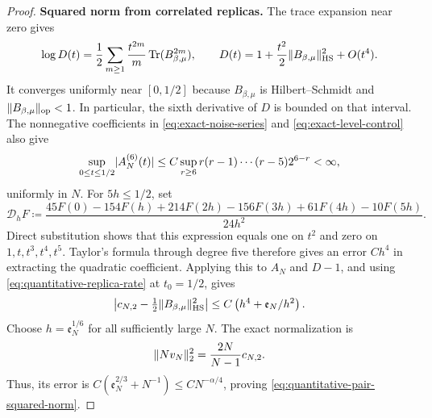 \documentclass[11pt,reqno]{amsart}
\numberwithin{equation}{section}
\theoremstyle{plain}
\theoremstyle{remark}
\DeclarePairedDelimiter{\abs}{\lvert}{\rvert}
\DeclarePairedDelimiter{\norm}{\lVert}{\rVert}
\newcommand{\be}{\beta}
\DeclareMathOperator{\Tr}{Tr}
\newcommand{\step}[1]{\par\medskip\noindent\textbf{#1}}
\begin{document}
\begin{proof}
\step{Squared norm from correlated replicas.}
The trace expansion near zero gives
\begin{equation}\label{eq:exact-small-t-logdet}
 \log D(t)=\frac12\sum_{m\geq1}\frac{t^{2m}}m\Tr(B_{\be,\mu}^{2m}),
 \qquad
 D(t)=1+\frac{t^2}{2}\norm{B_{\be,\mu}}_{\mathrm{HS}}^2+O(t^4).
\end{equation}
It converges uniformly near $[0,1/2]$ because $B_{\be,\mu}$ is
Hilbert--Schmidt and $\norm{B_{\be,\mu}}_{\mathrm{op}}<1$.
In particular, the sixth derivative of $D$ is bounded on that interval.
The nonnegative coefficients in \eqref{eq:exact-noise-series} and
\eqref{eq:exact-level-control} also give
\begin{equation}\label{eq:signed-replica-sixth-derivative}
 \sup_{0\leq t\leq1/2}\abs{A_N^{(6)}(t)}
 \leq C\sup_{r\geq6}r(r-1)\cdots(r-5)2^{6-r}<\infty,
\end{equation}
uniformly in $N$.  For $5h\leq1/2$, set
\begin{equation}\label{eq:quantitative-replica-stencil}
 \mathcal D_hF\coloneqq
 \frac{45F(0)-154F(h)+214F(2h)-156F(3h)+61F(4h)-10F(5h)}{24h^2}.
\end{equation}
Direct substitution shows that this expression equals one on $t^2$ and
zero on $1,t,t^3,t^4,t^5$.  Taylor's formula through degree five therefore
gives an error $Ch^4$ in extracting the quadratic coefficient.  Applying
this to $A_N$ and $D-1$, and using
\eqref{eq:quantitative-replica-rate} at $t_0=1/2$, gives
\begin{equation}\label{eq:quantitative-stencil-error}
 \left|c_{N,2}-\tfrac12\norm{B_{\be,\mu}}_{\mathrm{HS}}^2\right|
 \leq C\left(h^4+\mathfrak e_N/h^2\right).
\end{equation}
Choose $h=\mathfrak e_N^{1/6}$ for all sufficiently large $N$.  The exact
normalization is
\begin{equation}\label{eq:quantitative-pair-coefficient}
 \norm{Nv_N}_2^2=\frac{2N}{N-1}c_{N,2}.
\end{equation}
Thus, its error is $C(\mathfrak e_N^{2/3}+N^{-1})\leq CN^{-\alpha/4}$,
proving \eqref{eq:quantitative-pair-squared-norm}.


\end{proof}
\end{document}
